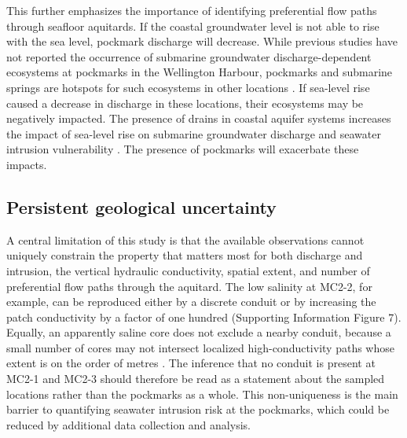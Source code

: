 \documentclass[pdflatex,sn-apa]{sn-jnl}%
\begin{document}
This further emphasizes the importance of identifying preferential flow paths through seafloor aquitards. If the coastal groundwater level is not able to rise with the sea level,
pockmark discharge will decrease.
While previous studies have not reported the occurrence of submarine groundwater discharge-dependent ecosystems at pockmarks in the Wellington Harbour,
pockmarks and submarine springs are hotspots for such ecosystems in other locations \citep{purkamo_impact_2022, idczak_geophysical_2020, taniguchi_submarine_2019}.
If sea-level rise caused a decrease in discharge in these locations, their ecosystems may be negatively impacted.
The presence of drains in coastal aquifer systems increases the impact of sea-level rise on submarine groundwater discharge and seawater intrusion vulnerability \citep{michael_global_2013, morgan_sea-level_2024, seibert_understanding_2024}.
The presence of pockmarks will exacerbate these impacts.

\subsection{Persistent geological uncertainty}

A central limitation of this study is that the available observations cannot uniquely constrain the property that matters most for both discharge and intrusion,
the vertical hydraulic conductivity, spatial extent, and number of preferential flow paths through the aquitard.
The low salinity at MC2-2, for example, can be reproduced either by a discrete conduit or by increasing the patch conductivity by a factor of one hundred (Supporting Information Figure 7).
Equally, an apparently saline core does not exclude a nearby conduit,
because a small number of cores may not intersect localized high-conductivity paths whose extent is on the order of metres \citep{hoffmann_fresh_2023}.
The inference that no conduit is present at MC2-1 and MC2-3 should therefore be read as a statement about the sampled locations rather than the pockmarks as a whole.
This non-uniqueness is the main barrier to quantifying seawater intrusion risk at the pockmarks, which could be reduced by additional data collection and analysis.
\end{document}
